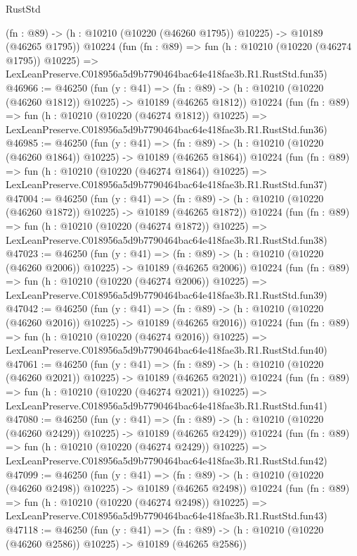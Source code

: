 \begin{lexlean}{RustStd}
\begin{coremodule}
    (fn : @89) -> (h : @10210 (@10220 (@46260 @1795)) @10225) -> @10189 (@46265 @1795))
    @10224
    (fun (fn : @89) =>
    fun (h : @10210 (@10220 (@46274 @1795)) @10225) =>
    LexLeanPreserve.C018956a5d9b7790464bac64e418fae3b.R1.RustStd.fun35)
@46966 := @46250
    (fun (y : @41) =>
    (fn : @89) -> (h : @10210 (@10220 (@46260 @1812)) @10225) -> @10189 (@46265 @1812))
    @10224
    (fun (fn : @89) =>
    fun (h : @10210 (@10220 (@46274 @1812)) @10225) =>
    LexLeanPreserve.C018956a5d9b7790464bac64e418fae3b.R1.RustStd.fun36)
@46985 := @46250
    (fun (y : @41) =>
    (fn : @89) -> (h : @10210 (@10220 (@46260 @1864)) @10225) -> @10189 (@46265 @1864))
    @10224
    (fun (fn : @89) =>
    fun (h : @10210 (@10220 (@46274 @1864)) @10225) =>
    LexLeanPreserve.C018956a5d9b7790464bac64e418fae3b.R1.RustStd.fun37)
@47004 := @46250
    (fun (y : @41) =>
    (fn : @89) -> (h : @10210 (@10220 (@46260 @1872)) @10225) -> @10189 (@46265 @1872))
    @10224
    (fun (fn : @89) =>
    fun (h : @10210 (@10220 (@46274 @1872)) @10225) =>
    LexLeanPreserve.C018956a5d9b7790464bac64e418fae3b.R1.RustStd.fun38)
@47023 := @46250
    (fun (y : @41) =>
    (fn : @89) -> (h : @10210 (@10220 (@46260 @2006)) @10225) -> @10189 (@46265 @2006))
    @10224
    (fun (fn : @89) =>
    fun (h : @10210 (@10220 (@46274 @2006)) @10225) =>
    LexLeanPreserve.C018956a5d9b7790464bac64e418fae3b.R1.RustStd.fun39)
@47042 := @46250
    (fun (y : @41) =>
    (fn : @89) -> (h : @10210 (@10220 (@46260 @2016)) @10225) -> @10189 (@46265 @2016))
    @10224
    (fun (fn : @89) =>
    fun (h : @10210 (@10220 (@46274 @2016)) @10225) =>
    LexLeanPreserve.C018956a5d9b7790464bac64e418fae3b.R1.RustStd.fun40)
@47061 := @46250
    (fun (y : @41) =>
    (fn : @89) -> (h : @10210 (@10220 (@46260 @2021)) @10225) -> @10189 (@46265 @2021))
    @10224
    (fun (fn : @89) =>
    fun (h : @10210 (@10220 (@46274 @2021)) @10225) =>
    LexLeanPreserve.C018956a5d9b7790464bac64e418fae3b.R1.RustStd.fun41)
@47080 := @46250
    (fun (y : @41) =>
    (fn : @89) -> (h : @10210 (@10220 (@46260 @2429)) @10225) -> @10189 (@46265 @2429))
    @10224
    (fun (fn : @89) =>
    fun (h : @10210 (@10220 (@46274 @2429)) @10225) =>
    LexLeanPreserve.C018956a5d9b7790464bac64e418fae3b.R1.RustStd.fun42)
@47099 := @46250
    (fun (y : @41) =>
    (fn : @89) -> (h : @10210 (@10220 (@46260 @2498)) @10225) -> @10189 (@46265 @2498))
    @10224
    (fun (fn : @89) =>
    fun (h : @10210 (@10220 (@46274 @2498)) @10225) =>
    LexLeanPreserve.C018956a5d9b7790464bac64e418fae3b.R1.RustStd.fun43)
@47118 := @46250
    (fun (y : @41) =>
    (fn : @89) -> (h : @10210 (@10220 (@46260 @2586)) @10225) -> @10189 (@46265 @2586))

\end{coremodule}
\end{lexlean}

